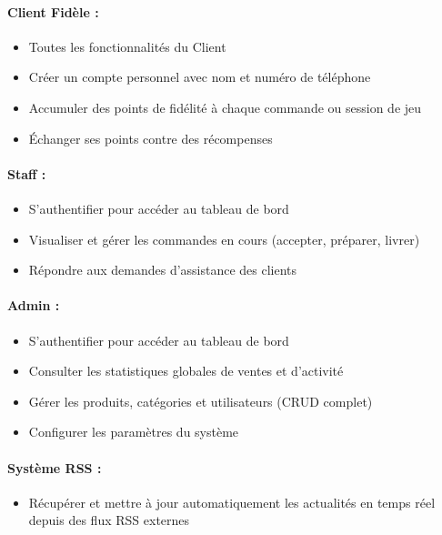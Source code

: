 \paragraph{Client Fidèle :}
\begin{itemize}
    \item Toutes les fonctionnalités du Client
    \item Créer un compte personnel avec nom et numéro de téléphone
    \item Accumuler des points de fidélité à chaque commande ou session de jeu
    \item Échanger ses points contre des récompenses
\end{itemize}

\paragraph{Staff :}
\begin{itemize}
    \item S'authentifier pour accéder au tableau de bord
    \item Visualiser et gérer les commandes en cours (accepter, préparer, livrer)
    \item Répondre aux demandes d'assistance des clients
\end{itemize}

\paragraph{Admin :}
\begin{itemize}
    \item S'authentifier pour accéder au tableau de bord
    \item Consulter les statistiques globales de ventes et d'activité
    \item Gérer les produits, catégories et utilisateurs (CRUD complet)
    \item Configurer les paramètres du système
\end{itemize}

\paragraph{Système RSS :}
\begin{itemize}
    \item Récupérer et mettre à jour automatiquement les actualités en temps réel
          depuis des flux RSS externes
\end{itemize}

